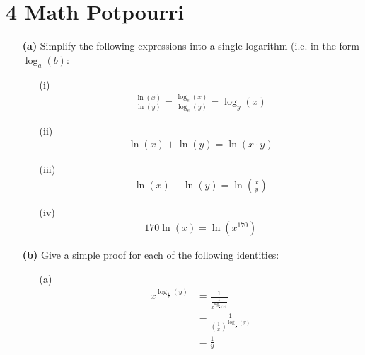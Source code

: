 \documentclass[12pt]{article}
\begin{document}
    \section*{4 Math Potpourri}
    \begin{enumerate}
        \item[\textbf{(a)}] Simplify the following expressions into a single logarithm (i.e. in the form $\log_a(b)$:
            \begin{enumerate} 
                \item[(i)]
                \color{blue}
                    \begin{align*}
                        \frac{\ln(x)}{\ln(y)} = \frac{\log_e(x)}{\log_e(y)} = \boxed{\log_y(x)}
                    \end{align*}
                \color{black}
                \item[(ii)]
                \color{blue}
                    \begin{align*}
                        \ln(x) + \ln(y) = \boxed{\ln(x \cdot y)}
                    \end{align*}
                \color{black}
                \item[(iii)]
                \color{blue}
                    \begin{align*}
                        \ln(x) - \ln(y) = \boxed{\ln\left(\frac{x}{y}\right)}
                    \end{align*}
                \color{black}
                \item[(iv)]
                \color{blue}
                    \begin{align*}
                        170\ln(x) = \boxed{\ln(x^{170})}
                    \end{align*}
                \color{black}
            \end{enumerate}
        \item[\textbf{(b)}] Give a simple proof for each of the following identities:
            \begin{enumerate}
                \item[(a)]
                \color{blue}
                    \begin{align*}
                        x^{\log_{\frac{1}{x}}(y)} &= \frac{1}{\frac{1}{x^{\log_{\frac{1}{x}(y)}}}} \\
                        &= \frac{1}{\left(\frac{1}{x}\right)^{\log_{\frac{1}{x}}(y)}} \\
                        &= \frac{1}{y}

\end{align*}
\end{enumerate}
\end{enumerate}
\end{document}
